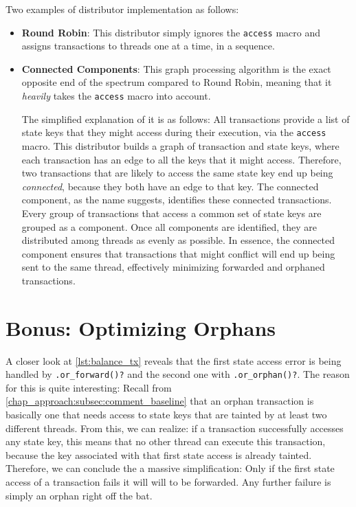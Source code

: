 Two examples of distributor implementation as follows:

\begin{itemize}
	\item \textbf{Round Robin}: This distributor simply ignores the \texttt{access} macro and
	assigns transactions to threads one at a time, in a sequence.
	\item \textbf{Connected Components}\cite{nuutilaFindingStronglyConnected1994}: This graph
	processing algorithm is the exact opposite end of the spectrum compared to Round Robin, meaning
	that it \textit{heavily} takes the \texttt{access} macro into account.

	The simplified explanation of it is as follows: All transactions provide a list of state keys
	that they might access during their execution, via the \texttt{access} macro. This distributor
	builds a graph of transaction and state keys, where each transaction has an edge to all the keys
	that it might access. Therefore, two transactions that are likely to access the same state key
	end up being \textit{connected}, because they both have an edge to that key. The connected
	component, as the name suggests, identifies these connected transactions. Every group of
	transactions that access a common set of state keys are grouped as a component. Once all
	components are identified, they are distributed among threads as evenly as possible. In essence,
	the connected component ensures that transactions that might conflict will end up being sent to
	the same thread, effectively minimizing forwarded and orphaned transactions.
\end{itemize}

\section{Bonus: Optimizing Orphans} \label{chap_impl:sec:opt_orph}

A closer look at \ref{lst:balance_tx} reveals that the first state access error is being handled by
\texttt{.or\_forward()?} and the second one with \texttt{.or\_orphan()?}. The reason for this is
quite interesting: Recall from \ref{chap_approach:subsec:comment_baseline} that an orphan
transaction is basically one that needs access to state keys that are tainted by at least two
different threads. From this, we can realize: if a transaction successfully accesses any state key,
this means that no other thread can execute this transaction, because the key associated with that
first state access is already tainted. Therefore, we can conclude the a massive simplification: Only
if the first state access of a transaction fails it will will to be forwarded. Any further failure
is simply an orphan right off the bat.

